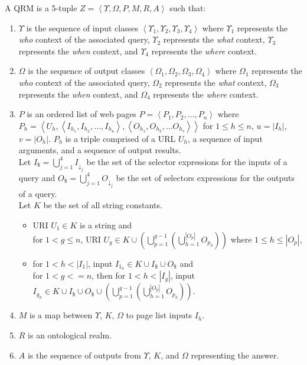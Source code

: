 \documentclass{www2010-submission}
\begin{document}
A QRM is a 5-tuple $Z = \left< \Upsilon, \Omega, P, M, R, A \right>$ such that:

\begin{enumerate}

\item $\Upsilon$ is the sequence of input classes $\left< \Upsilon_{1}, \Upsilon_{2}, \Upsilon_{3}, \Upsilon_{4} \right>$ where $\Upsilon_{1}$ represents the \emph{who} context of the associated query, $\Upsilon_{2}$ represents the \emph{what} context, $\Upsilon_{3}$ represents the \emph{when} context, and $\Upsilon_{4}$ represents the \emph{where} context.

\item $\Omega$ is the sequence of output classes $\left<\Omega_{1}, \Omega_{2}, \Omega_{3}, \Omega_{4}\right>$ where $\Omega_{1}$ represents the \emph{who} context of the associated query, $\Omega_{2}$ represents the \emph{what} context, $\Omega_{3}$ represents the \emph{when} context, and $\Omega_{4}$ represents the \emph{where} context.

\item $P$ is an ordered list of web pages $P = \left<P_1,P_2,..., P_n\right>$ where $P_h = \left<U_h,\left<I_{h_1},I_{h_2},...,I_{h_u}\right>,\left<O_{h_1},O_{h_2},...O_{h_v}\right>\right>$ for $1 \leq h \leq n$, $u = \left| I_h \right|$, $v = \left| O_h \right|$. $P_h$ is a triple comprised of a URL $U_h$, a sequence of input arguments, and a sequence of output results.
\\
Let $I_{\$} = \bigcup_{j=1}^{4} I_{\downarrow_j}$ be the set of the selector expressions for the inputs of a query and $O_{\$} = \bigcup_{j=1}^{4} O_{\downarrow_j}$ be the set of selectors expressions for the outputs of a query.
\\
Let $K$ be the set of all string constants.
\begin{itemize}
\item URI $U_1 \in K$ is a string and \\
for $1 < g \leq n$, URI $U_g \in K \cup \left( \bigcup^{g-1}_{p=1} \left( \bigcup^{\left|O_p\right|}_{h=1}O_{p_h} \right)\right)$ where $1 \leq h \leq \left| O_p \right| $,

\item for $1 < h < \left| I_1 \right|$, input $I_{1_h} \in K \cup I_{\$} \cup O_{\$}$ and \\
for $1 < g <= n$, then for $1 < h < \left| I_g \right|$, input $I_{g_h} \in K \cup I_{\$} \cup O_{\$} \cup \left( \bigcup^{g-1}_{p=1} \left( \bigcup^{\left|O_p\right|}_{h=1}O_{p_h} \right)\right)$.
\end{itemize}

\item $M$ is a map between $\Upsilon$, $K$, $\Omega$ to page list inputs $I_h$.

\item $R$ is an ontological realm. 

\item $A$ is the sequence of outputs from $\Upsilon$, $K$, and $\Omega$ representing the answer.

\end{enumerate}
\end{document}
